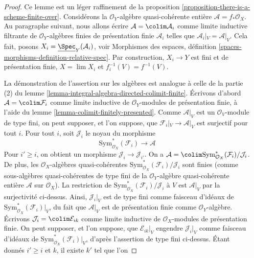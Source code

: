 \begin{proof}
Ce lemme est un léger raffinement de la proposition
\ref{proposition-there-is-a-scheme-finite-over}.
Considérons la $\mathcal{O}_Y$-algèbre quasi-cohérente entière
$\mathcal{A} = f_*\mathcal{O}_X$. Au paragraphe suivant, nous allons
écrire $\mathcal{A} = \colim \mathcal{A}_i$ comme limite inductive
filtrante de $\mathcal{O}_Y$-algèbres finies de présentation finie
$\mathcal{A}_i$ telles que $\mathcal{A}_i|_V = \mathcal{A}|_V$.
Cela fait, posons $X_i = \underline{\Spec}_Y(\mathcal{A}_i)$, voir
Morphismes des espaces, définition
\ref{spaces-morphisms-definition-relative-spec}.
Par construction, $X_i \to Y$ est fini et de présentation finie,
$X = \lim X_i$ et $f_i^{-1}(V) = f^{-1}(V)$.

\medskip\noindent
La démonstration de l'assertion sur les algèbres est analogue à
celle de la partie (2) du
lemme \ref{lemma-integral-algebra-directed-colimit-finite}.
Écrivons d'abord $\mathcal{A} = \colim \mathcal{F}_i$
comme limite inductive de $\mathcal{O}_Y$-modules de présentation finie, à l'aide du
lemme \ref{lemma-colimit-finitely-presented}.
Comme $\mathcal{A}|_V$ est un $\mathcal{O}_V$-module de type fini,
on peut supposer, et l'on suppose, que $\mathcal{F}_i|_V \to \mathcal{A}|_V$
est surjectif pour tout $i$.
Pour tout $i$, soit $\mathcal{J}_i$ le noyau du morphisme
$$
\text{Sym}^*_{\mathcal{O}_X}(\mathcal{F}_i) \longrightarrow \mathcal{A}
$$
Pour $i' \geq i$, on obtient un morphisme $\mathcal{J}_i \to \mathcal{J}_{i'}$.
On a $\mathcal{A} =
\colim \text{Sym}^*_{\mathcal{O}_X}(\mathcal{F}_i)/\mathcal{J}_i$.
De plus, les $\mathcal{O}_X$-algèbres quasi-cohérentes
$\text{Sym}^*_{\mathcal{O}_X}(\mathcal{F}_i)/\mathcal{J}_i$
sont finies (comme sous-algèbres quasi-cohérentes de type fini de la
$\mathcal{O}_Y$-algèbre quasi-cohérente entière $\mathcal{A}$ sur $\mathcal{O}_X$).
La restriction de $\text{Sym}^*_{\mathcal{O}_X}(\mathcal{F}_i)/\mathcal{J}_i$
à $V$ est $\mathcal{A}|_V$ par la surjectivité ci-dessus.
Ainsi, $\mathcal{J}_i|_V$ est de type fini comme faisceau d'idéaux de
$\text{Sym}^*_{\mathcal{O}_X}(\mathcal{F}_i)|_V$, du fait que
$\mathcal{A}|_V$ est de présentation finie comme
$\mathcal{O}_Y$-algèbre.
Écrivons $\mathcal{J}_i = \colim \mathcal{E}_{ik}$
comme limite inductive de $\mathcal{O}_X$-modules de présentation finie.
On peut supposer, et l'on suppose, que $\mathcal{E}_{ik}|_V$
engendre $\mathcal{J}_i|_V$ comme faisceau d'idéaux de
$\text{Sym}^*_{\mathcal{O}_X}(\mathcal{F}_i)|_V$, d'après
l'assertion de type fini ci-dessus.
Étant donnés $i' \geq i$ et $k$, il existe $k'$ tel que l'on

\end{proof}
